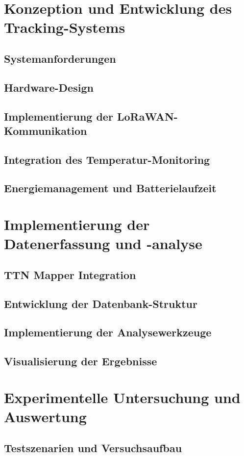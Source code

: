 \documentclass[
	a4paper,
	12pt,
	bibtotoc,
	listof=totoc,
	titlepage
]{scrartcl}
\begin{document}
\section{Konzeption und Entwicklung des Tracking-Systems}
\subsection{Systemanforderungen}
\subsection{Hardware-Design}
\subsection{Implementierung der LoRaWAN-Kommunikation}
\subsection{Integration des Temperatur-Monitoring}
\subsection{Energiemanagement und Batterielaufzeit}

\section{Implementierung der Datenerfassung und -analyse}
\subsection{TTN Mapper Integration}
\subsection{Entwicklung der Datenbank-Struktur}
\subsection{Implementierung der Analysewerkzeuge}
\subsection{Visualisierung der Ergebnisse}

\section{Experimentelle Untersuchung und Auswertung}
\subsection{Testszenarien und Versuchsaufbau}
\end{document}
